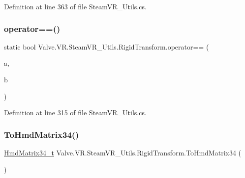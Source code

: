 Definition at line 363 of file Steam\+V\+R\+\_\+\+Utils.\+cs.

\mbox{\label{struct_valve_1_1_v_r_1_1_steam_v_r___utils_1_1_rigid_transform_a80039f648bd317d1834312fcfdf05bf7}} 
\subsubsection{\texorpdfstring{operator==()}{operator==()}}
{\footnotesize\ttfamily static bool Valve.\+V\+R.\+Steam\+V\+R\+\_\+\+Utils.\+Rigid\+Transform.\+operator== (\begin{DoxyParamCaption}\item[{\mbox{\hyperlink{struct_valve_1_1_v_r_1_1_steam_v_r___utils_1_1_rigid_transform}{Rigid\+Transform}}}]{a,  }\item[{\mbox{\hyperlink{struct_valve_1_1_v_r_1_1_steam_v_r___utils_1_1_rigid_transform}{Rigid\+Transform}}}]{b }\end{DoxyParamCaption})\hspace{0.3cm}{\ttfamily [static]}}



Definition at line 315 of file Steam\+V\+R\+\_\+\+Utils.\+cs.

\mbox{\label{struct_valve_1_1_v_r_1_1_steam_v_r___utils_1_1_rigid_transform_a6f239f71cb7465d26cd782037a31f4b9}} 
\subsubsection{\texorpdfstring{ToHmdMatrix34()}{ToHmdMatrix34()}}
{\footnotesize\ttfamily \mbox{\hyperlink{struct_valve_1_1_v_r_1_1_hmd_matrix34__t}{Hmd\+Matrix34\+\_\+t}} Valve.\+V\+R.\+Steam\+V\+R\+\_\+\+Utils.\+Rigid\+Transform.\+To\+Hmd\+Matrix34 (\begin{DoxyParamCaption}{ }\end{DoxyParamCaption})}



